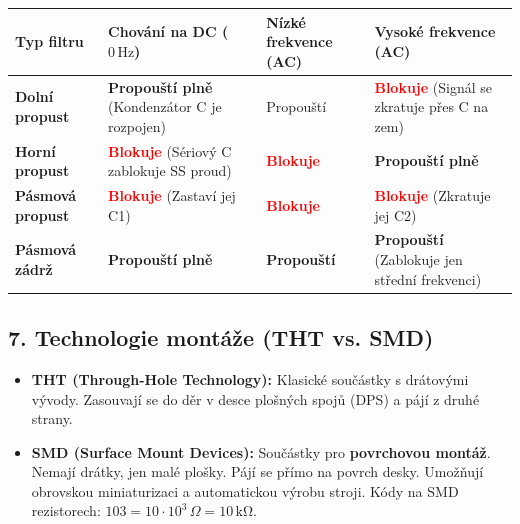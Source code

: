 \documentclass[a4paper,10pt]{article}
\begin{document}
\begin{vysvetlenibox}
\begin{center}
\begin{tabularx}{\linewidth}{@{} l X X X @{}}
\toprule
\textbf{Typ filtru} & \textbf{Chování na DC ($0\,\mathrm{Hz}$)} & \textbf{Nízké frekvence (AC)} & \textbf{Vysoké frekvence (AC)} \\
\midrule
\textbf{Dolní propust} & \textcolor{green!60!black}{\textbf{Propouští plně}} (Kondenzátor C je rozpojen) & Propouští & \textcolor{red}{\textbf{Blokuje}} (Signál se zkratuje přes C na zem) \\
\midrule
\textbf{Horní propust} & \textcolor{red}{\textbf{Blokuje}} (Sériový C zablokuje SS proud) & \textcolor{red}{\textbf{Blokuje}} & \textcolor{green!60!black}{\textbf{Propouští plně}} \\
\midrule
\textbf{Pásmová propust} & \textcolor{red}{\textbf{Blokuje}} (Zastaví jej C1) & \textcolor{red}{\textbf{Blokuje}} & \textcolor{red}{\textbf{Blokuje}} (Zkratuje jej C2) \\
\midrule
\textbf{Pásmová zádrž} & \textcolor{green!60!black}{\textbf{Propouští plně}} & \textcolor{green!60!black}{\textbf{Propouští}} & \textcolor{green!60!black}{\textbf{Propouští}} (Zablokuje jen střední frekvenci) \\
\bottomrule
\end{tabularx}
\end{center}

\subsection*{7. Technologie montáže (THT vs. SMD)}

\begin{itemize}
    \item \textbf{THT (Through-Hole Technology):} Klasické součástky s drátovými vývody. Zasouvají se do děr v desce plošných spojů (DPS) a pájí z druhé strany.
    \item \textbf{SMD (Surface Mount Devices):} Součástky pro \textbf{povrchovou montáž}. Nemají drátky, jen malé plošky. Pájí se přímo na povrch desky. Umožňují obrovskou miniaturizaci a automatickou výrobu stroji. Kódy na SMD rezistorech: $103 = 10 \cdot 10^3\,\Omega = 10\,\mathrm{k\Omega}$.
\end{itemize}

\end{vysvetlenibox}
\end{document}
